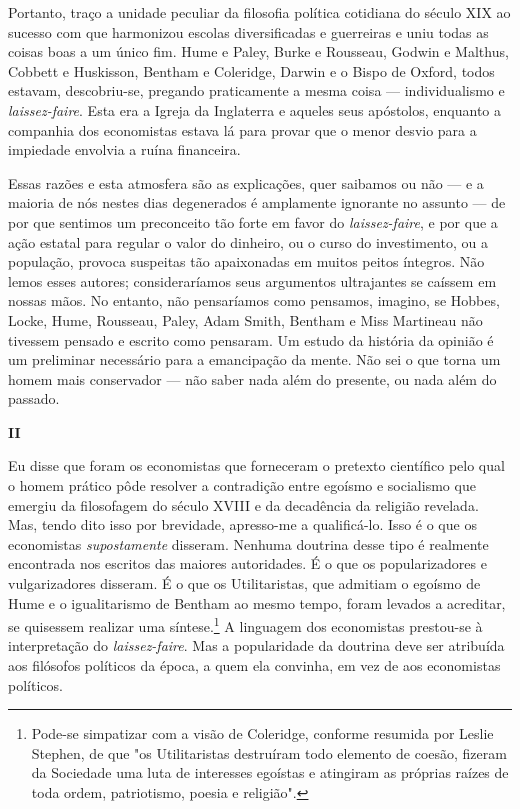 \documentclass[12pt]{article}
\begin{document}
Portanto, traço a unidade peculiar da filosofia política cotidiana do século XIX ao sucesso com que harmonizou escolas diversificadas e guerreiras e uniu todas as coisas boas a um único fim. Hume e Paley, Burke e Rousseau, Godwin e Malthus, Cobbett e Huskisson, Bentham e Coleridge, Darwin e o Bispo de Oxford, todos estavam, descobriu-se, pregando praticamente a mesma coisa — individualismo e \textit{laissez-faire}. Esta era a Igreja da Inglaterra e aqueles seus apóstolos, enquanto a companhia dos economistas estava lá para provar que o menor desvio para a impiedade envolvia a ruína financeira.

Essas razões e esta atmosfera são as explicações, quer saibamos ou não — e a maioria de nós nestes dias degenerados é amplamente ignorante no assunto — de por que sentimos um preconceito tão forte em favor do \textit{laissez-faire}, e por que a ação estatal para regular o valor do dinheiro, ou o curso do investimento, ou a população, provoca suspeitas tão apaixonadas em muitos peitos íntegros. Não lemos esses autores; consideraríamos seus argumentos ultrajantes se caíssem em nossas mãos. No entanto, não pensaríamos como pensamos, imagino, se Hobbes, Locke, Hume, Rousseau, Paley, Adam Smith, Bentham e Miss Martineau não tivessem pensado e escrito como pensaram. Um estudo da história da opinião é um preliminar necessário para a emancipação da mente. Não sei o que torna um homem mais conservador — não saber nada além do presente, ou nada além do passado.

\begin{center}
\textbf{II}
\end{center}

Eu disse que foram os economistas que forneceram o pretexto científico pelo qual o homem prático pôde resolver a contradição entre egoísmo e socialismo que emergiu da filosofagem do século XVIII e da decadência da religião revelada. Mas, tendo dito isso por brevidade, apresso-me a qualificá-lo. Isso é o que os economistas \textit{supostamente} disseram. Nenhuma doutrina desse tipo é realmente encontrada nos escritos das maiores autoridades. É o que os popularizadores e vulgarizadores disseram. É o que os Utilitaristas, que admitiam o egoísmo de Hume e o igualitarismo de Bentham ao mesmo tempo, foram levados a acreditar, se quisessem realizar uma síntese.\footnote{Pode-se simpatizar com a visão de Coleridge, conforme resumida por Leslie Stephen, de que "os Utilitaristas destruíram todo elemento de coesão, fizeram da Sociedade uma luta de interesses egoístas e atingiram as próprias raízes de toda ordem, patriotismo, poesia e religião".} A linguagem dos economistas prestou-se à interpretação do \textit{laissez-faire}. Mas a popularidade da doutrina deve ser atribuída aos filósofos políticos da época, a quem ela convinha, em vez de aos economistas políticos.
\end{document}
